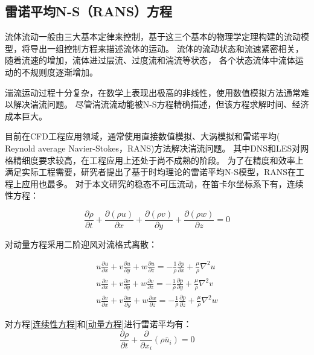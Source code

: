 \subsection{雷诺平均N-S（RANS）方程}
流体流动一般由三大基本定律来控制，基于这三个基本的物理学定理构建的流动模型，将导出一组控制方程来描述流体的运动。
流体的流动状态和流速紧密相关，随着流速的增加，流体进过层流、过度流和湍流等状态，
各个状态流体中流体运动的不规则度逐渐增加。

湍流运动过程十分复杂，在数学上表现出极高的非线性，使用数值模拟方法通常难以解决湍流问题。
尽管湍流流动能被N-S方程精确描述，但该方程求解时间、经济成本巨大。

目前在CFD工程应用领域，通常使用直接数值模拟、大涡模拟和雷诺平均( Reynold average Navier-Stokes，RANS)方法解决湍流问题。
其中DNS和LES对网格精细度要求较高，在工程应用上还处于尚不成熟的阶段。
为了在精度和效率上满足实际工程需要，研究者提出了基于时均理论的雷诺平均N-S模型，RANS在工程上应用也最多。
对于本文研究的稳态不可压流动，在笛卡尔坐标系下有，连续性方程：

\begin{equation}
\label{连续性方程}
\frac{\partial \rho}{\partial t}+\frac{\partial(\rho u)}{\partial x}+\frac{\partial(\rho v)}{\partial y}+\frac{\partial(\rho w)}{\partial z}=0\end{equation}

\noindent 对动量方程采用二阶迎风对流格式离散：


\begin{equation}\begin{array}{c}
\label{动量方程}
u \frac{\partial u}{\partial x}+v \frac{\partial u}{\partial y}+w \frac{\partial u}{\partial z}=-\frac{1}{\rho} \frac{\partial p}{\partial x}+\frac{\mu}{\rho} \nabla^{2} u \\
u \frac{\partial v}{\partial x}+v \frac{\partial v}{\partial y}+w \frac{\partial v}{\partial z}=-\frac{1}{\rho} \frac{\partial p}{\partial y}+\frac{\mu}{\rho} \nabla^{2} v \\
u \frac{\partial v}{\partial x}+v \frac{\partial w}{\partial y}+w \frac{\partial w}{\partial z}=-\frac{1}{\rho} \frac{\partial p}{\partial z}+\frac{\mu}{\rho} \nabla^{2} w
\end{array}
\end{equation}


\noindent 对方程\ref{连续性方程}和\ref{动量方程}进行雷诺平均有：
\begin{equation}\frac{\partial \rho}{\partial t}+\frac{\partial}{\partial x_{i}}\left(\rho \bar{u}_{i}\right)=0\end{equation}

